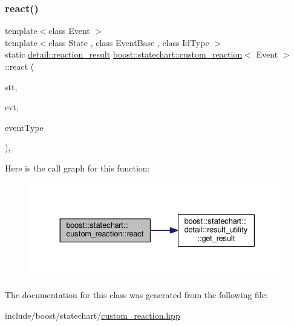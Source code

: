\subsubsection{\texorpdfstring{react()}{react()}}
{\footnotesize\ttfamily template$<$class Event $>$ \\
template$<$class State , class Event\+Base , class Id\+Type $>$ \\
static \mbox{\hyperlink{namespaceboost_1_1statechart_1_1detail_ab091bbb4c29327fb46ee479ea1b7255b}{detail\+::reaction\+\_\+result}} \mbox{\hyperlink{classboost_1_1statechart_1_1custom__reaction}{boost\+::statechart\+::custom\+\_\+reaction}}$<$ Event $>$\+::react (\begin{DoxyParamCaption}\item[{State \&}]{stt,  }\item[{const Event\+Base \&}]{evt,  }\item[{const Id\+Type \&}]{event\+Type }\end{DoxyParamCaption})\hspace{0.3cm}{\ttfamily [inline]}, {\ttfamily [static]}}

Here is the call graph for this function\+:
\nopagebreak
\begin{figure}[H]
\begin{center}
\leavevmode
\includegraphics[width=330pt]{classboost_1_1statechart_1_1custom__reaction_a1de25f5eb09b254a6acf2e7bcfc2289b_cgraph}
\end{center}
\end{figure}


The documentation for this class was generated from the following file\+:\begin{DoxyCompactItemize}
\item 
include/boost/statechart/\mbox{\hyperlink{custom__reaction_8hpp}{custom\+\_\+reaction.\+hpp}}\end{DoxyCompactItemize}
